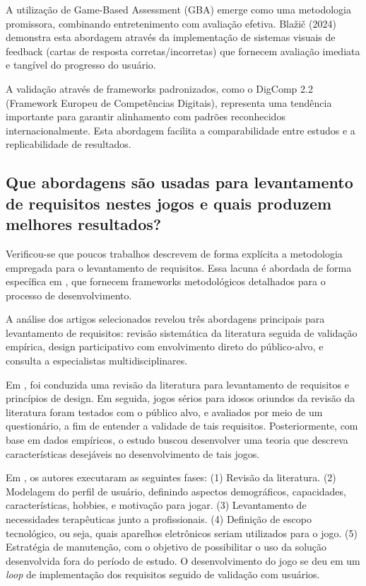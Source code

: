 \begin{table}[H]
A utilização de Game-Based Assessment (GBA) emerge como uma metodologia promissora, combinando entretenimento com avaliação efetiva. Blažič (2024) demonstra esta abordagem através da implementação de sistemas visuais de feedback (cartas de resposta corretas/incorretas) que fornecem avaliação imediata e tangível do progresso do usuário.

A validação através de frameworks padronizados, como o DigComp 2.2 (Framework Europeu de Competências Digitais), representa uma tendência importante para garantir alinhamento com padrões reconhecidos internacionalmente. Esta abordagem facilita a comparabilidade entre estudos e a replicabilidade de resultados.

\subsection{Que abordagens são usadas para levantamento de requisitos nestes jogos e quais produzem melhores resultados?}
\label{subsec:qp3}

Verificou-se que poucos trabalhos descrevem de forma explícita a metodologia empregada para o levantamento de requisitos. Essa lacuna é abordada de forma específica em \cite{machado2018heuristics, manser2021making}, que fornecem frameworks metodológicos detalhados para o processo de desenvolvimento.

A análise dos artigos selecionados revelou três abordagens principais para levantamento de requisitos: revisão sistemática da literatura seguida de validação empírica, design participativo com envolvimento direto do público-alvo, e consulta a especialistas multidisciplinares.

Em \cite{machado2018heuristics}, foi conduzida uma revisão da literatura para levantamento de requisitos e princípios de design. Em seguida, jogos sérios para idosos oriundos da revisão da literatura foram testados com o público alvo, e avaliados por meio de um questionário, a fim de entender a validade de tais requisitos. Posteriormente, com base em dados empíricos, o estudo buscou desenvolver uma teoria que descreva características desejáveis no desenvolvimento de tais jogos.

Em \cite{manser2021making}, os autores executaram as seguintes fases: (1) Revisão da literatura. (2) Modelagem do perfil de usuário, definindo aspectos demográficos, capacidades, características, hobbies, e motivação para jogar. (3) Levantamento de necessidades terapêuticas junto a profissionais. (4) Definição de escopo tecnológico, ou seja, quais aparelhos eletrônicos seriam utilizados para o jogo. (5) Estratégia de manutenção, com o objetivo de possibilitar o uso da solução desenvolvida fora do período de estudo. O desenvolvimento do jogo se deu em um \textit{loop} de implementação dos requisitos seguido de validação com usuários.


\end{table}
